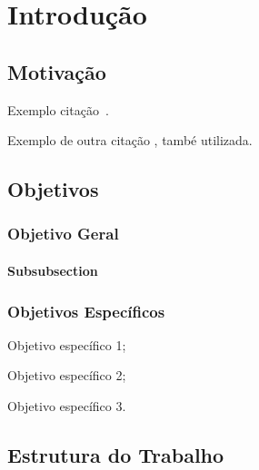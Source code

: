 \chapter{Introdução}
\label{ch:introducao}

\section{Motivação}
\label{sec:motivacao}

Exemplo citação~\cite{lamport1986latex}.

Exemplo de outra citação , també utilizada.

\section{Objetivos}
\label{sec:objetivos}

\subsection{Objetivo Geral}
\label{subsec:objetivo-geral}

\subsubsection{Subsubsection}
\label{subsubsec:subsubsection}

\subsection{Objetivos Específicos}
\label{subsec:objetivos-especificos}
	\begin{alineas}
	    \item Objetivo específico 1;
		\item Objetivo específico 2;
		\item Objetivo específico 3.
	\end{alineas}

\section{Estrutura do Trabalho}
\label{sec:estrutura-do-trabalho}